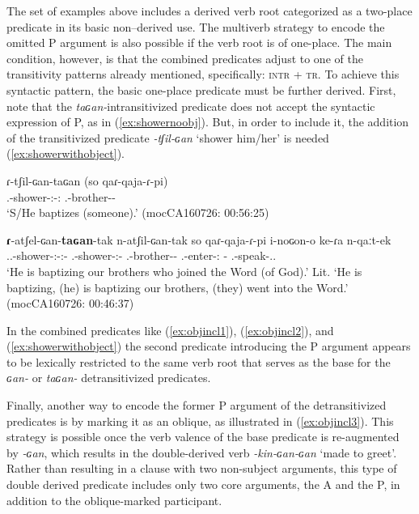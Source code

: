 \documentclass[12pt]{article}
\begin{document}
 The set of examples above includes a derived verb root categorized as a two-place predicate in its basic non--derived use. The multiverb strategy to encode the omitted P argument is also possible if the verb root is of one-place. The main condition, however, is that the combined predicates adjust to one of the transitivity patterns already mentioned, specifically:  \textsc{intr} + \textsc{tr}. To achieve this syntactic pattern, the basic one-place predicate must be further derived.  First,  note that the \textit{taɢan-}intransitivized predicate does not accept the syntactic expression of P, as in (\ref{ex:showernoobj}). But, in order to include it, the addition of the transitivized predicate \textit{-tʃil-ɢan} `shower him/her' is needed (\ref{ex:showerwithobject}). 

\begin{exe}
\ex\label{ex:}
\begin{xlist}
\ex 	
\gll ɾ-tʃil-ɢan-taɢan (\Ungr so qaɾ-qaja-ɾ-pi)\\
     {\Third.\III}-shower-{\Vm:\Tr}-{\Vm:\Intr} {}{\DetTwo} {\First\Pl.\Poss}-brother-{\Pl}-{\Coll}  \\
\trans `S/He baptizes (someone).'  \hfill  (mocCA160726: 00:56:25)\label{ex:showernoobj}
	
\ex 
\gll \textbf{ɾ}-atʃel-ɢan-\textbf{taɢan}-tak n-atʃil-ɢan-tak so qaɾ-qaja-ɾ-pi i-noɢon-o ke-ɾa n-qaːt-ek  \\
{\Third.\III.\Intr}-shower-{\Vm:\Tr}-{\Vm:\Intr}-{\Prog} {\Third.\III}-shower-{\Vm:\Tr}-{\Prog} {\DetTwo} {\First\Pl.\Poss}-brother-{\Pl}-{\Coll} {\Third.\II}-enter-{\Dir:\In} {\Obl}-{\DetFour} {\Indet.\Poss}-speak-{\Sg.\Obj.\Nmlz}\\
\trans `He is baptizing our brothers who joined the Word (of God).'
\trans Lit. `He is baptizing, (he) is baptizing our brothers, (they) went into the Word.'
\trans \hfill  (mocCA160726: 00:46:37) \label{ex:showerwithobject}	
\end{xlist}
\end{exe}

In the combined predicates like (\ref{ex:objincl1}), (\ref{ex:objincl2}), and (\ref{ex:showerwithobject}) the second predicate introducing the P argument appears to be lexically restricted to the same verb root that serves as the base for the \textit{ɢan-} or \textit{taɢan-} detransitivized predicates. 

Finally, another way to encode the former P argument of the detransitivized predicates is by marking it as an oblique, as illustrated in (\ref{ex:objincl3}). This strategy is possible once the verb valence of the base predicate is re-augmented by \textit{-ɢan}, which results in the double-derived verb \textit{-kin-ɢan-ɢan} `made to greet'. Rather than resulting in a clause with two non-subject arguments, this type of double derived predicate includes only two core arguments, the A and the P, in addition to the oblique-marked participant. 
\end{document}
